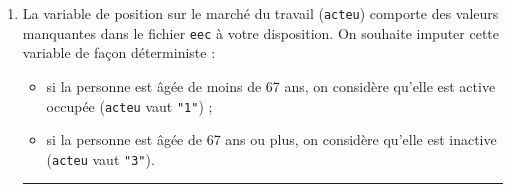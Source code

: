 \documentclass[12pt,twosided, notitlepage]{book}
\newenvironment{Shaded}{}{}
\newcommand{\KeywordTok}[1]{\textcolor[rgb]{0.00,0.00,1.00}{#1}}
\newcommand{\DataTypeTok}[1]{#1}
\newcommand{\DecValTok}[1]{#1}
\newcommand{\StringTok}[1]{\textcolor[rgb]{0.00,0.50,0.50}{#1}}
\newcommand{\CommentTok}[1]{\textcolor[rgb]{0.00,0.50,0.00}{#1}}
\newcommand{\OperatorTok}[1]{#1}
\newcommand{\NormalTok}[1]{#1}
\providecommand{\tightlist}{%
  \setlength{\itemsep}{0pt}\setlength{\parskip}{0pt}}
\newif \ifsol
\renewenvironment{Shaded}{\begin{snugshade}}{\end{snugshade}}
\begin{document}
\begin{enumerate}
\begin{enumerate}
    \ifsol 

    \begin{center} \rule{0.5\linewidth}{\linethickness}\end{center}

\begin{Shaded}
\begin{Highlighting}[]

\CommentTok{# La fonction substr() permet de sélectionner}
\CommentTok{# des caractères dans une chaîne}
\KeywordTok{substr}\NormalTok{(}\KeywordTok{c}\NormalTok{(}\StringTok{"abcd"}\NormalTok{, }\StringTok{"efgh"}\NormalTok{, }\StringTok{"ijkl"}\NormalTok{), }\DataTypeTok{start =} \DecValTok{2}\NormalTok{, }\DataTypeTok{stop =} \DecValTok{3}\NormalTok{)}
\NormalTok{  ## [1] "bc" "fg" "jk"}

\CommentTok{# Application à l'EEC}
\NormalTok{eec}\OperatorTok{$}\NormalTok{cs2 <-}\StringTok{ }\KeywordTok{substr}\NormalTok{(eec}\OperatorTok{$}\NormalTok{cse, }\DataTypeTok{start =} \DecValTok{1}\NormalTok{, }\DataTypeTok{stop =} \DecValTok{1}\NormalTok{)}

\CommentTok{# On vérifie qu'on obtient bien la même chose par les deux méthodes}
\KeywordTok{identical}\NormalTok{(eec}\OperatorTok{$}\NormalTok{cs, eec}\OperatorTok{$}\NormalTok{cs2)}
\NormalTok{  ## [1] TRUE}
\end{Highlighting}
\end{Shaded}

    \begin{center} \rule{0.5\linewidth}{\linethickness}\end{center}

    \bigskip  \fi 
  \end{enumerate}
\item
  La variable de position sur le marché du travail (\texttt{acteu})
  comporte des valeurs manquantes dans le fichier \texttt{eec} à votre
  disposition. On souhaite imputer cette variable de façon déterministe
  :

  \begin{itemize}
  \tightlist
  \item
    si la personne est âgée de moins de 67 ans, on considère qu'elle est
    active occupée (\texttt{acteu} vaut \texttt{"1"}) ;
  \item
    si la personne est âgée de 67 ans ou plus, on considère qu'elle est
    inactive (\texttt{acteu} vaut \texttt{"3"}).
  \end{itemize}

  \begin{center}\rule{0.5\linewidth}{\linethickness}\end{center}


\end{enumerate}
\end{document}
